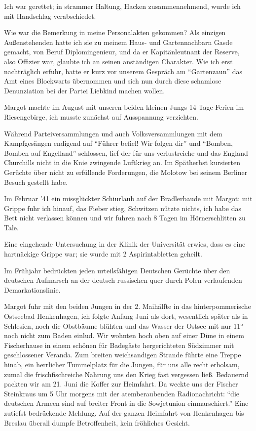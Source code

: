 Ich war gerettet; in strammer Haltung, Hacken zusammennehmend, wurde ich mit Handschlag verabschiedet.

 Wie war die Bemerkung in meine Personalakten gekommen? Als einzigen Außenstehenden hatte ich sie zu meinem Haus- und Gartennachbarn Gasde gemacht, von Beruf Diplomingenieur, und da er Kapitänleutnant der Reserve, also Offizier war, glaubte ich an seinen anständigen Charakter. Wie ich erst nachträglich erfuhr, hatte er kurz vor unserem Gespräch am \enquote{Gartenzaun} das Amt eines Blockwarts übernommen und sich nun durch diese schamlose Denunziation bei der Partei Liebkind machen wollen.

Margot machte im August mit unseren beiden kleinen Jungs 14 Tage Ferien im Riesengebirge, ich musste zunächst auf Ausspannung verzichten.

Während Parteiversammlungen und auch Volksversammlungen mit dem Kampfgesängen endigend auf \enquote{Führer befiel! Wir folgen dir} und \enquote{Bomben, Bomben auf Engelland} schlossen,  lief der für uns verlustreiche und das England Churchills nicht in die Knie zwingende Luftkrieg an.  Im Spätherbst kursierten Gerüchte über nicht zu erfüllende Forderungen, die Molotow bei seinem Berliner Besuch gestellt habe.

Im Februar '41 ein missglückter Schiurlaub auf der Bradlerbaude mit Margot: mit Grippe fuhr ich hinauf, das Fieber stieg, Schwitzen nützte nichts, ich habe das Bett nicht verlassen können und wir fuhren nach 8 Tagen im Hörnerschlitten zu Tale.

Eine eingehende Untersuchung in der Klinik der Universität erwies, dass es eine hartnäckige Grippe war; sie wurde mit 2 Aspirintabletten geheilt.

Im Frühjahr bedrückten jeden urteilsfähigen Deutschen Gerüchte über den deutschen Aufmarsch an der deutsch-russischen quer durch Polen verlaufenden Demarkationslinie.

Margot fuhr mit den beiden Jungen in der 2. Maihälfte in das hinterpommerische Ostseebad Henkenhagen, ich folgte Anfang Juni als dort, wesentlich später als in Schlesien, noch die Obstbäume blühten und das Wasser der Ostsee mit nur 11° noch nicht zum Baden einlud. Wir wohnten hoch oben auf einer Düne in einem Fischerhause in einem schönen für Badegäste hergerichteten Südzimmer mit geschlossener Veranda. Zum breiten weichsandigen Strande führte eine Treppe hinab, ein herrlicher Tummelplatz für die Jungen, für uns alle recht erholsam, zumal die frischfischreiche Nahrung uns den Krieg fast vergessen ließ. Bedauernd packten wir am 21. Juni die Koffer zur Heimfahrt. Da weckte uns der Fischer Steinkraus um 5 Uhr morgens mit der atemberaubenden Radionachricht: \enquote{die deutschen Armeen sind auf breiter Front in die Sowjetunion einmarschiert.} Eine zutiefst bedrückende Meldung. Auf der  ganzen Heimfahrt von Henkenhagen bis Breslau überall dumpfe Betroffenheit, kein fröhliches Gesicht.

